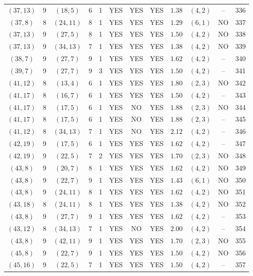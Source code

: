 \begin{longtable}{|c|c|c|c|c|c|c|c|c|c|c|c|}
$(37,13)$ & 9 & $(18,5)$ & 6 & 1 & YES & YES & YES & $1.38$ & $(4,2)$ & -- & 336\\
$(37,8)$ & 8 & $(24,11)$ & 8 & 1 & YES & YES & YES & $1.29$ & $(6,1)$ & NO & 337\\
$(37,13)$ & 9 & $(27,5)$ & 8 & 1 & YES & YES & YES & $1.50$ & $(4,2)$ & NO & 338\\
$(37,13)$ & 9 & $(34,13)$ & 7 & 1 & YES & YES & YES & $1.38$ & $(4,2)$ & NO & 339\\
$(38,7)$ & 9 & $(27,7)$ & 9 & 1 & YES & YES & YES & $1.62$ & $(4,2)$ & -- & 340\\
$(39,7)$ & 9 & $(27,7)$ & 9 & 3 & YES & YES & YES & $1.50$ & $(4,2)$ & -- & 341\\
$(41,12)$ & 8 & $(13,4)$ & 6 & 1 & YES & YES & YES & $1.80$ & $(2,3)$ & NO & 342\\
$(41,17)$ & 8 & $(16,7)$ & 6 & 1 & YES & YES & YES & $1.50$ & $(4,2)$ & -- & 343\\
$(41,17)$ & 8 & $(17,5)$ & 6 & 1 & YES & NO & YES & $1.88$ & $(2,3)$ & NO & 344\\
$(41,17)$ & 8 & $(17,5)$ & 6 & 1 & YES & NO & YES & $1.88$ & $(2,3)$ & -- & 345\\
$(41,12)$ & 8 & $(34,13)$ & 7 & 1 & YES & NO & YES & $2.12$ & $(4,2)$ & -- & 346\\
$(42,19)$ & 9 & $(17,5)$ & 6 & 1 & YES & YES & YES & $1.62$ & $(4,2)$ & -- & 347\\
$(42,19)$ & 9 & $(22,5)$ & 7 & 2 & YES & YES & YES & $1.70$ & $(2,3)$ & NO & 348\\
$(43,8)$ & 9 & $(20,7)$ & 8 & 1 & YES & YES & YES & $1.62$ & $(4,2)$ & NO & 349\\
$(43,8)$ & 9 & $(22,7)$ & 9 & 1 & YES & YES & YES & $1.43$ & $(6,1)$ & NO & 350\\
$(43,8)$ & 9 & $(24,11)$ & 8 & 1 & YES & YES & YES & $1.62$ & $(4,2)$ & NO & 351\\
$(43,18)$ & 8 & $(24,11)$ & 8 & 1 & YES & YES & YES & $1.38$ & $(4,2)$ & NO & 352\\
$(43,8)$ & 9 & $(27,7)$ & 9 & 1 & YES & YES & YES & $1.62$ & $(4,2)$ & -- & 353\\
$(43,12)$ & 8 & $(34,13)$ & 7 & 1 & YES & NO & YES & $2.00$ & $(4,2)$ & -- & 354\\
$(43,8)$ & 9 & $(42,11)$ & 9 & 1 & YES & YES & YES & $1.70$ & $(2,3)$ & NO & 355\\
$(45,8)$ & 9 & $(22,7)$ & 9 & 1 & YES & YES & YES & $1.50$ & $(4,2)$ & NO & 356\\
$(45,16)$ & 9 & $(22,5)$ & 7 & 1 & YES & YES & YES & $1.50$ & $(4,2)$ & -- & 357\\

\end{longtable}
